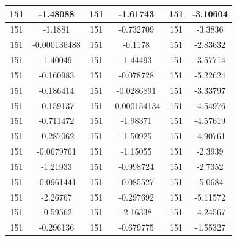 \documentclass{article}
\begin{document}
\begin{tabular}{cccccc}
151&-1.48088&151&-1.61743&151&-3.10604 \\ \hline
151&-1.1881&151&-0.732709&151&-3.3836 \\ \hline
151&-0.000136488&151&-0.1178&151&-2.83632 \\ \hline
151&-1.40049&151&-1.44493&151&-3.57714 \\ \hline
151&-0.160983&151&-0.078728&151&-5.22624 \\ \hline
151&-0.186414&151&-0.0286891&151&-3.33797 \\ \hline
151&-0.159137&151&-0.000154134&151&-4.54976 \\ \hline
151&-0.711472&151&-1.98371&151&-4.57619 \\ \hline
151&-0.287062&151&-1.50925&151&-4.90761 \\ \hline
151&-0.0679761&151&-1.15055&151&-2.3939 \\ \hline
151&-1.21933&151&-0.998724&151&-2.7352 \\ \hline
151&-0.0961441&151&-0.085527&151&-5.0684 \\ \hline
151&-2.26767&151&-0.297692&151&-5.11572 \\ \hline
151&-0.59562&151&-2.16338&151&-4.24567 \\ \hline
151&-0.296136&151&-0.679775&151&-4.55327 \\ \hline
\end{tabular}
\end{document}
